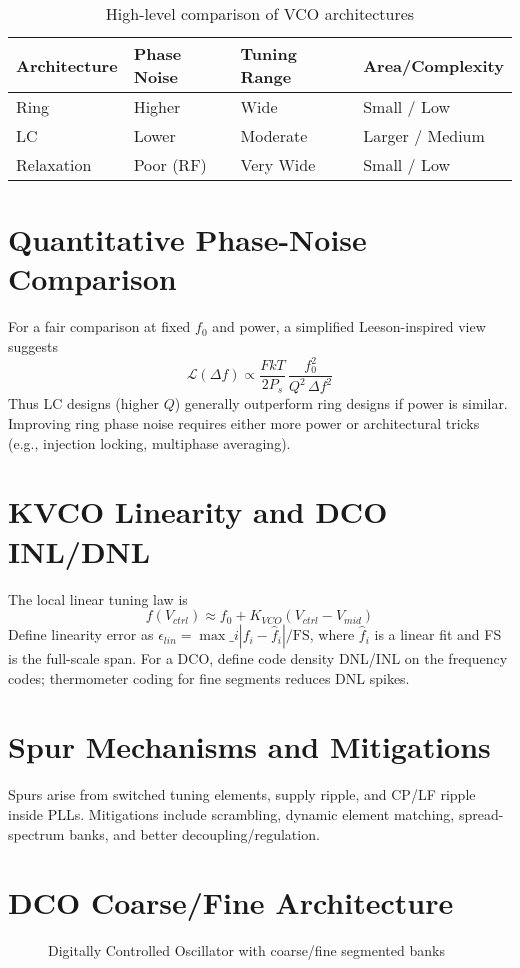 \begin{table}[H]
  \centering
  \begin{tabular}{llll}
    \toprule
    Architecture & Phase Noise & Tuning Range & Area/Complexity \\
    \midrule
    Ring & Higher & Wide & Small / Low \\
    LC & Lower & Moderate & Larger / Medium \\
    Relaxation & Poor (RF) & Very Wide & Small / Low \\
    \bottomrule
  \end{tabular}
  \caption{High-level comparison of VCO architectures}
\end{table}

\section{Quantitative Phase-Noise Comparison}
For a fair comparison at fixed \(f_0\) and power, a simplified Leeson-inspired view suggests
\[
 \mathcal{L}(\Delta f) \propto \frac{F k T}{2 P_s}\,\frac{f_0^2}{Q^2\,\Delta f^2}
\]
Thus LC designs (higher \(Q\)) generally outperform ring designs if power is similar. Improving ring phase noise requires either more power or architectural tricks (e.g., injection locking, multiphase averaging).

\section{KVCO Linearity and DCO INL/DNL}
The local linear tuning law is
\[
 f(V_{ctrl}) \approx f_0 + K_{VCO}(V_{ctrl}-V_{mid})
\]
Define linearity error as \(\epsilon_{lin} = \max\_i |f_i - \hat{f}_i|/\text{FS}\), where \(\hat{f}_i\) is a linear fit and FS is the full-scale span. For a DCO, define code density DNL/INL on the frequency codes; thermometer coding for fine segments reduces DNL spikes.

\section{Spur Mechanisms and Mitigations}
Spurs arise from switched tuning elements, supply ripple, and CP/LF ripple inside PLLs. Mitigations include scrambling, dynamic element matching, spread-spectrum banks, and better decoupling/regulation.

\section{DCO Coarse/Fine Architecture}
\begin{figure}[H]
  \centering
  \caption{Digitally Controlled Oscillator with coarse/fine segmented banks}
\end{figure}


